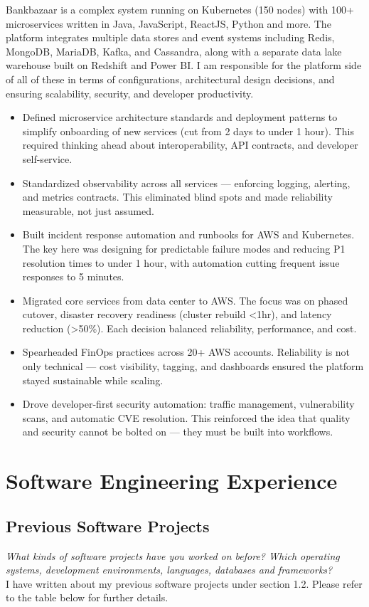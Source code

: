 \documentclass{article}
\begin{document}
Bankbazaar is a complex system running on Kubernetes (150 nodes) with 100+ microservices written in Java, JavaScript, ReactJS, Python and more. The platform integrates multiple data stores and event systems including Redis, MongoDB, MariaDB, Kafka, and Cassandra, along with a separate data lake warehouse built on Redshift and Power BI. I am responsible for the platform side of all of these in terms of configurations, architectural design decisions, and ensuring scalability, security, and developer productivity.  


\begin{itemize}
    \item Defined microservice architecture standards and deployment patterns to simplify onboarding of new services (cut from 2 days to under 1 hour). This required thinking ahead about interoperability, API contracts, and developer self-service.  
    \item Standardized observability across all services — enforcing logging, alerting, and metrics contracts. This eliminated blind spots and made reliability measurable, not just assumed.  
    \item Built incident response automation and runbooks for AWS and Kubernetes. The key here was designing for predictable failure modes and reducing P1 resolution times to under 1 hour, with automation cutting frequent issue responses to 5 minutes.  
    \item Migrated core services from data center to AWS. The focus was on phased cutover, disaster recovery readiness (cluster rebuild <1hr), and latency reduction (>50\%). Each decision balanced reliability, performance, and cost.  
    \item Spearheaded FinOps practices across 20+ AWS accounts. Reliability is not only technical — cost visibility, tagging, and dashboards ensured the platform stayed sustainable while scaling.  
    \item Drove developer-first security automation: traffic management, vulnerability scans, and automatic CVE resolution. This reinforced the idea that quality and security cannot be bolted on — they must be built into workflows.  
\end{itemize}

\section{Software Engineering Experience}

\subsection{Previous Software Projects}
\small \textit{What kinds of software projects have you worked on before? Which operating systems, development environments, languages, databases and frameworks?} 
\normalsize 
\\[1em]
I have written about my previous software projects under section 1.2. Please refer to the table below for further details.
\end{document}
